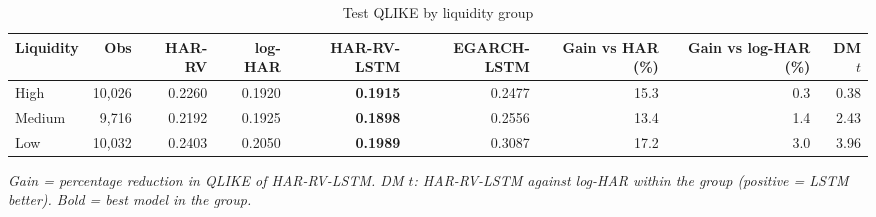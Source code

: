 \begin{table}[htbp]
\centering
\caption{Test QLIKE by liquidity group}
\label{tab:liquidity}
\small
\begin{adjustbox}{max width=\textwidth}
\begin{tabular}{lrrrrrrrr}
\toprule
Liquidity & Obs & HAR-RV & log-HAR & HAR-RV-LSTM & EGARCH-LSTM & Gain vs HAR (\%) & Gain vs log-HAR (\%) & DM $t$ \\
\midrule
High & 10,026 & 0.2260 & 0.1920 & \textbf{0.1915} & 0.2477 & 15.3 & 0.3 & 0.38 \\
Medium & 9,716 & 0.2192 & 0.1925 & \textbf{0.1898} & 0.2556 & 13.4 & 1.4 & 2.43 \\
Low & 10,032 & 0.2403 & 0.2050 & \textbf{0.1989} & 0.3087 & 17.2 & 3.0 & 3.96 \\
\bottomrule
\end{tabular}
\end{adjustbox}
\par\smallskip\parbox{0.95\textwidth}{\footnotesize\itshape Gain = percentage reduction in QLIKE of HAR-RV-LSTM. DM $t$: HAR-RV-LSTM against log-HAR within the group (positive = LSTM better). Bold = best model in the group.}
\end{table}
